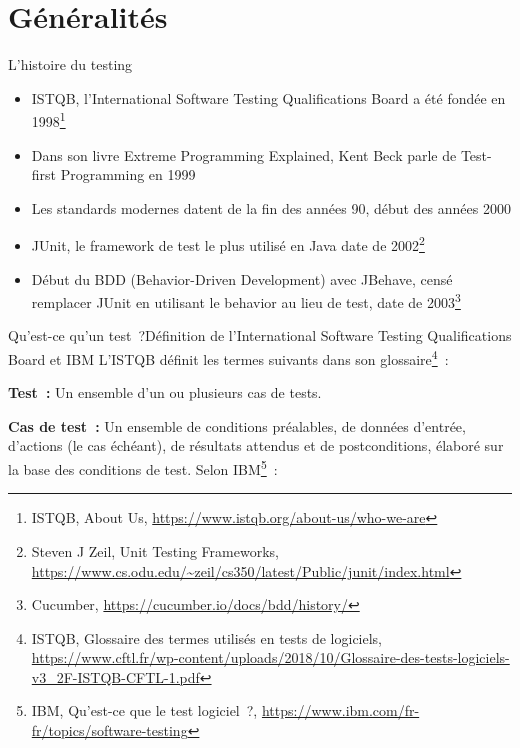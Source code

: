 \documentclass{beamer}
\begin{document}
    \section{Généralités}\label{sec:generalites}
    \begin{frame}{L'histoire du testing}

        \begin{itemize}

            \item ISTQB, l'International Software Testing Qualifications Board a été fondée en 1998\footnote{ISTQB, About Us, \url{https://www.istqb.org/about-us/who-we-are}}
            \item Dans son livre Extreme Programming Explained, Kent Beck parle de Test-first Programming en 1999
            \item Les standards modernes datent de la fin des années 90, début des années 2000
            \item JUnit, le framework de test le plus utilisé en Java date de 2002\footnote{Steven J Zeil, Unit Testing Frameworks, \url{https://www.cs.odu.edu/~zeil/cs350/latest/Public/junit/index.html}}
            \item Début du BDD (Behavior-Driven Development) avec JBehave, censé remplacer JUnit en utilisant le behavior au lieu de test, date de 2003\footnote{Cucumber, \url{https://cucumber.io/docs/bdd/history/}}
        \end{itemize}

    \end{frame}

    \begin{frame}{Qu’est-ce qu’un test~?}{Définition de l'International Software Testing Qualifications Board et IBM}
        \transdissolve
        L’ISTQB définit les termes suivants dans son glossaire\footnote{ISTQB, Glossaire des termes utilisés en tests de logiciels, \url{https://www.cftl.fr/wp-content/uploads/2018/10/Glossaire-des-tests-logiciels-v3_2F-ISTQB-CFTL-1.pdf}}~:

        \textbf{Test~:} Un ensemble d’un ou plusieurs cas
        de tests.

        \textbf{Cas de test~:} Un ensemble de conditions
        préalables, de données d'entrée, d'actions
        (le cas échéant), de résultats attendus et
        de postconditions, élaboré sur la base des
        conditions de test.
        \bigbreak
        Selon IBM\footnote{IBM, Qu'est-ce que le test logiciel~?, \url{https://www.ibm.com/fr-fr/topics/software-testing}}~:

    \end{frame}
\end{document}
